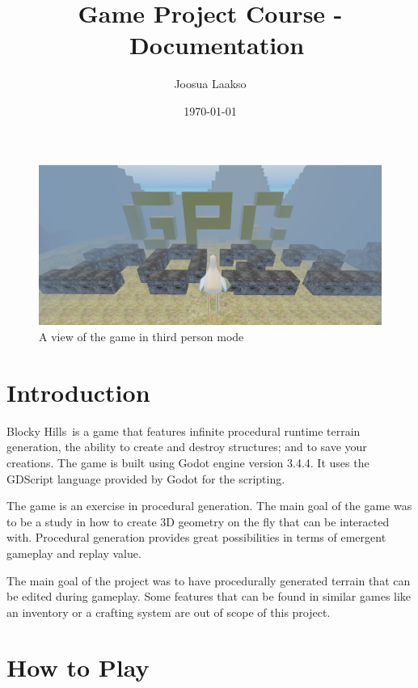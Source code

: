 \documentclass{report}
\title{Game Project Course -  \gamename\ Documentation}
\author{Joosua Laakso}
\date{\today}
\newcommand{\gamename}{Blocky Hills}
\begin{document}
\maketitle
\begin{figure}[h]
	\centering
	\includegraphics[scale=0.27]{gpc2022}
	\caption{A view of the game in third person mode}
\end{figure}
\tableofcontents

\section{Introduction}

\gamename\ is a game that features infinite procedural runtime terrain generation, the ability to create and destroy structures; and to save your creations. The game is built using Godot engine\cite{godotengine} version 3.4.4. It uses the GDScript language provided by Godot for the scripting.\par
The game is an exercise in procedural generation. The main goal of the game was to be a study in how to create 3D geometry on the fly that can be interacted with. Procedural generation provides great possibilities in terms of emergent gameplay and replay value.\par
The main goal of the project was to have procedurally generated terrain that can be edited during gameplay. Some features that can be found in similar games like an inventory or a crafting system are out of scope of this project.

\section{How to Play}
\end{document}
